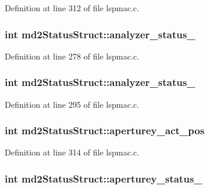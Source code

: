 Definition at line 312 of file lspmac.\-c.

\hypertarget{structmd2StatusStruct_ab876b484f55bcce576fcd89dcc3f7267}{
\subsubsection[{analyzer\-\_\-status\-\_\-1}]{\setlength{\rightskip}{0pt plus 5cm}int md2\-Status\-Struct\-::analyzer\-\_\-status\-\_}}\label{structmd2StatusStruct_ab876b484f55bcce576fcd89dcc3f7267}


Definition at line 278 of file lspmac.\-c.

\hypertarget{structmd2StatusStruct_a4f88bb778e4e18f1fbf7672ac11e7433}{
\subsubsection[{analyzer\-\_\-status\-\_\-2}]{\setlength{\rightskip}{0pt plus 5cm}int md2\-Status\-Struct\-::analyzer\-\_\-status\-\_}}\label{structmd2StatusStruct_a4f88bb778e4e18f1fbf7672ac11e7433}


Definition at line 295 of file lspmac.\-c.

\hypertarget{structmd2StatusStruct_a2a434d2b57dbb669de0765486a1516ff}{
\subsubsection[{aperturey\-\_\-act\-\_\-pos}]{\setlength{\rightskip}{0pt plus 5cm}int md2\-Status\-Struct\-::aperturey\-\_\-act\-\_\-pos}}\label{structmd2StatusStruct_a2a434d2b57dbb669de0765486a1516ff}


Definition at line 314 of file lspmac.\-c.

\hypertarget{structmd2StatusStruct_a2ef953eaddf7058bf4276585e6ff066b}{
\subsubsection[{aperturey\-\_\-status\-\_\-1}]{\setlength{\rightskip}{0pt plus 5cm}int md2\-Status\-Struct\-::aperturey\-\_\-status\-\_}}\label{structmd2StatusStruct_a2ef953eaddf7058bf4276585e6ff066b}


